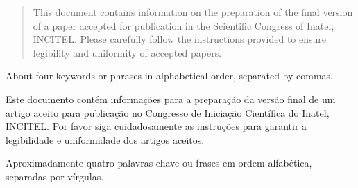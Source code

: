 \begin{abstract}
   This document contains information on the preparation of the final
   version of a paper accepted for publication in the Scientific Congress of Inatel, INCITEL. Please carefully follow the instructions provided to ensure legibility and uniformity of accepted papers. 
  \end{abstract}

  \begin{IEEEkeywords}
    About four keywords or phrases in alphabetical order, separated by commas.
  \end{IEEEkeywords}

  \begin{resumo}
    Este documento contém informações para a preparação da versão final de um artigo aceito para publicação no Congresso de Iniciação Científica do Inatel, INCITEL. Por favor siga cuidadosamente as instruções para garantir a legibilidade e uniformidade dos artigos aceitos.
  \end{resumo}
  
  \begin{palavraschave}
    
    Aproximadamente quatro palavras chave ou frases em ordem alfabética, separadas por vírgulas.
  \end{palavraschave}